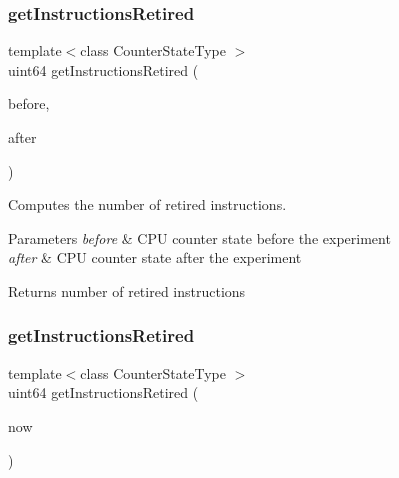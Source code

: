 \subsubsection{\texorpdfstring{get\+Instructions\+Retired}{getInstructionsRetired}\hspace{0.1cm}{\footnotesize\ttfamily [1/2]}}
{\footnotesize\ttfamily template$<$class Counter\+State\+Type $>$ \\
uint64 get\+Instructions\+Retired (\begin{DoxyParamCaption}\item[{const Counter\+State\+Type \&}]{before,  }\item[{const Counter\+State\+Type \&}]{after }\end{DoxyParamCaption})\hspace{0.3cm}{\ttfamily [friend]}}



Computes the number of retired instructions. 


\begin{DoxyParams}{Parameters}
{\em before} & C\+PU counter state before the experiment \\
\hline
{\em after} & C\+PU counter state after the experiment \\
\hline
\end{DoxyParams}
\begin{DoxyReturn}{Returns}
number of retired instructions 
\end{DoxyReturn}
\mbox{\label{class_basic_counter_state_afced47e4bb3712da79dc64cb16ac335a}} 
\subsubsection{\texorpdfstring{get\+Instructions\+Retired}{getInstructionsRetired}\hspace{0.1cm}{\footnotesize\ttfamily [2/2]}}
{\footnotesize\ttfamily template$<$class Counter\+State\+Type $>$ \\
uint64 get\+Instructions\+Retired (\begin{DoxyParamCaption}\item[{const Counter\+State\+Type \&}]{now }\end{DoxyParamCaption})\hspace{0.3cm}{\ttfamily [friend]}}



